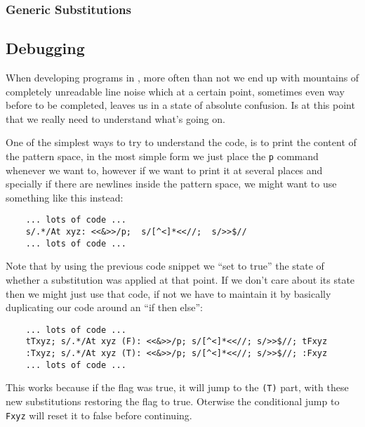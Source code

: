 \subsubsection{Generic Substitutions}

\subsection{Debugging}

When developing programs in \sed, more often than not we end up with mountains
of completely unreadable line noise which at a certain point, sometimes even
way before to be completed, leaves us in a state of absolute confusion.  Is at
this point that we really need to understand what's going on.

One of the simplest ways to try to understand the code, is to print the content
of the pattern space, in the most simple form we just place the {\tt p} command
whenever we want to, however if we want to print it at several places and
specially if there are newlines inside the pattern space, we might want to use
something like this instead:

\begin{Verbatim}
	... lots of code ...
	s/.*/At xyz: <<&>>/p;  s/[^<]*<<//;  s/>>$//
	... lots of code ...
\end{Verbatim}

Note that by using the previous code snippet we ``set to true'' the state of
whether a substitution was applied at that point.  If we don't care about its
state then we might just use that code, if not we have to maintain it by
basically duplicating our code around an ``if then else'':

\begin{Verbatim}
	... lots of code ...
	tTxyz; s/.*/At xyz (F): <<&>>/p; s/[^<]*<<//; s/>>$//; tFxyz
	:Txyz; s/.*/At xyz (T): <<&>>/p; s/[^<]*<<//; s/>>$//; :Fxyz
	... lots of code ...
\end{Verbatim}

This works because if the flag was true, it will jump to the {\tt (T)} part,
with these new substitutions restoring the flag to true.
Oterwise the conditional jump to {\tt Fxyz} will reset it to false
before continuing.

